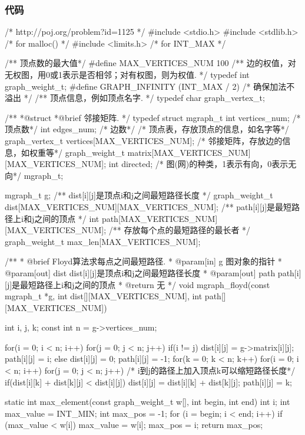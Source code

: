 \subsubsection{代码}
\begin{Codex}[label=poj_1125.c]
/* http://poj.org/problem?id=1125 */
#include <stdio.h>
#include <stdlib.h>  /* for malloc() */
#include <limits.h>  /* for INT_MAX */

/** 顶点数的最大值*/
#define MAX_VERTICES_NUM 100
/** 边的权值，对无权图，用0或1表示是否相邻；对有权图，则为权值. */
typedef int graph_weight_t;
#define GRAPH_INFINITY (INT_MAX / 2)   /* 确保加法不溢出 */
/** 顶点信息，例如顶点名字. */
typedef char graph_vertex_t;

/**
 *@struct
 *@brief 邻接矩阵.
 */
typedef struct mgraph_t {
    int vertices_num; /* 顶点数*/
    int edges_num; /* 边数*/
    /* 顶点表，存放顶点的信息，如名字等*/
    graph_vertex_t vertices[MAX_VERTICES_NUM];
    /* 邻接矩阵，存放边的信息，如权重等*/
    graph_weight_t matrix[MAX_VERTICES_NUM][MAX_VERTICES_NUM];
    int directed; /* 图(网)的种类，1表示有向，0表示无向*/
} mgraph_t;


mgraph_t g;
/** dist[i][j]是顶点i和j之间最短路径长度 */
graph_weight_t dist[MAX_VERTICES_NUM][MAX_VERTICES_NUM];
/** path[i][j]是最短路径上i和j之间的顶点 */
int path[MAX_VERTICES_NUM][MAX_VERTICES_NUM];
/** 存放每个点的最短路径的最长者 */
graph_weight_t max_len[MAX_VERTICES_NUM];

/**
  * @brief Floyd算法求每点之间最短路径.
  * @param[in] g 图对象的指针
  * @param[out] dist dist[i][j]是顶点i和j之间最短路径长度
  * @param[out] path path[i][j]是最短路径上i和j之间的顶点
  * @return 无
  */
void mgraph_floyd(const mgraph_t *g,
       int dist[][MAX_VERTICES_NUM],
       int path[][MAX_VERTICES_NUM]) {
    int i, j, k;
    const int n = g->vertices_num;

    for(i = 0; i < n; i++) {
        for(j = 0; j < n; j++) {
            if(i != j) {
                dist[i][j] = g->matrix[i][j];
                path[i][j] = i;
            } else {
                dist[i][j] = 0;
                path[i][j] = -1;
            }
        }
    }
    for(k = 0; k < n; k++) {
        for(i = 0; i < n; i++) {
            for(j = 0; j < n; j++) {
                /* i到j的路径上加入顶点k可以缩短路径长度*/
                if(dist[i][k] + dist[k][j] < dist[i][j]) {
                    dist[i][j] = dist[i][k] + dist[k][j];
                    path[i][j] = k;
                }
            }
        }
    }
}

static int max_element(const graph_weight_t w[], int begin, int end) {
    int i;
    int max_value = INT_MIN;
    int max_pos = -1;
    for (i = begin; i < end; i++) {
        if (max_value < w[i]) {
            max_value = w[i];
            max_pos = i;
        }
    }
    return max_pos;
}


\end{Codex}
